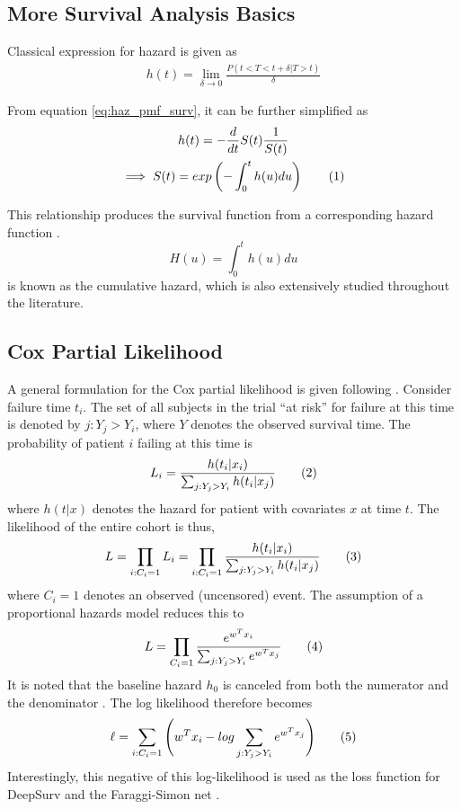 \documentclass[%
 twocolumn,
 reprint,
 amsmath,amssymb,
 aps,nofootinbib
]{revtex4-2}
\newcommand\numberthis{\addtocounter{equation}{1}\tag{\theequation}} %
\begin{document}
\subsection{\label{app:more_basics}More Survival Analysis Basics}
Classical expression for hazard is given as
\begin{align}
h(t) = \lim_{\delta\to0}\frac{P(t<T<t+\delta|T>t)}{\delta} \label{eq:haz}
\end{align}

From equation \ref{eq:haz_pmf_surv}, it can be further simplified as
\begin{gather*}
h(t) = -\frac{d}{dt}S(t)\frac{1}{S(t)}\\
\implies S(t) = exp\left (- \int_{0}^{t}h(u)du\right) \numberthis  \label{eq:cum_haz}
\end{gather*}

This relationship produces the survival function from a corresponding hazard function \cite{Moore_2016}.
\[
H(u) = \int_{0}^{t}h(u)du
\]
is known as the cumulative hazard, which is also extensively studied throughout the literature.

\subsection{\label{app:part_lik}Cox Partial Likelihood}
A general formulation for the Cox partial likelihood is given following \cite{Moore_2016}. Consider failure time $t_i$. The set of all subjects in the trial “at risk” for failure at this time is denoted by $j:Y_j>Y_i$, where $Y$ denotes the observed survival time. The probability of patient $i$ failing at this time is 
\[
L_i = \frac{h(t_i | x_i)}{\sum^{}_{j:Y_j>Y_i}h(t_i|x_j)} \numberthis  \label{eq:likelihood_contribution}
\]
where $h(t|x)$ denotes the hazard for patient with covariates $x$ at time $t$. The likelihood of the entire cohort is thus,
\[
L = \prod^{}_{i:C_i=1}L_i = \prod^{}_{i:C_i=1}\frac{h(t_i | x_i)}{\sum^{}_{j:Y_j>Y_i}h(t_i|x_j)} \numberthis  \label{eq:likelihood}
\]
where $C_i=1$ denotes an observed (uncensored) event. The assumption of a proportional hazards model reduces this to
\[
L = \prod^{}_{C_i=1}\frac{e^{w^Tx_i}}{\sum^{}_{j:Y_j>Y_i}e^{w^Tx_j}} \numberthis  \label{eq:reduced_likelihood_contribution}
\] 
It is noted that the baseline hazard $h_0$ is canceled from both the numerator and the denominator \cite{raykar_cindex}. The log likelihood therefore becomes
\[
\ell = \sum^{}_{i:C_i=1} \Bigg( w^Tx_i - log\sum^{}_{j:Y_j>Y_i}e^{w^Tx_j}\Bigg) \numberthis  \label{eq:log_likelihood}
\]
Interestingly, this negative of this log-likelihood is used as the loss function for DeepSurv \cite{deepsurv} and the Faraggi-Simon net \cite{faraggi_simons}.\\
\end{document}
